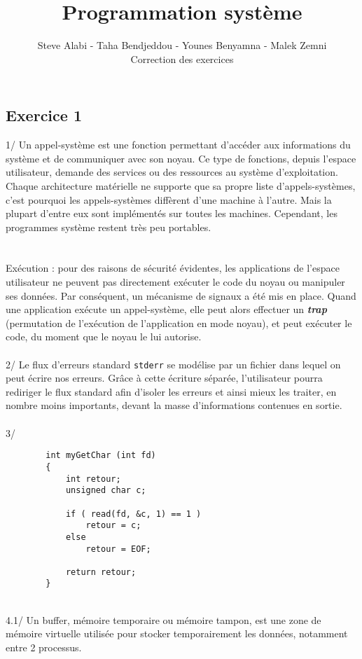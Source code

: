 \documentclass[a4paper,11pt]{article}
\title{\textbf{Programmation système}}
\author{
	Steve Alabi - Taha Bendjeddou - Younes Benyamna - Malek Zemni
	\vspace{1em}\\
	Correction des exercices
	\vspace{0.5em}
}
\begin{document}
\maketitle

	\subsection*{Exercice 1} 
	1/ Un appel-système est une fonction permettant d'accéder aux informations du système et de communiquer avec son noyau. Ce type de fonctions, depuis l’espace utilisateur, demande des services ou des ressources au système d’exploitation. Chaque architecture matérielle ne supporte que sa propre liste d’appels-systèmes, c’est pourquoi les appels-systèmes diffèrent d’une machine à l’autre. Mais la plupart d’entre eux sont implémentés sur toutes les machines. Cependant, les programmes système restent très peu portables.\\
	\\~\\
	Exécution : pour des raisons de sécurité évidentes, les applications de l’espace utilisateur ne peuvent pas directement exécuter le code du noyau ou manipuler ses données. Par conséquent, un mécanisme de signaux a été mis en place. Quand une application exécute un appel-système, elle peut alors effectuer un \textit{\textbf{trap}} (permutation de l’exécution de l’application en mode noyau), et peut exécuter le code, du moment que le noyau le lui autorise.
	\\~\\
	2/ Le flux d'erreurs standard \lstinline!stderr! se modélise par un fichier dans lequel on peut écrire nos erreurs. Grâce à cette écriture séparée, l'utilisateur pourra rediriger le flux standard afin d'isoler les erreurs et ainsi mieux les traiter, en nombre moins importants, devant la masse d'informations contenues en sortie. 
	\\~\\
	3/ 
	\begin{lstlisting}
		int myGetChar (int fd) 
		{
			int retour;
			unsigned char c;
			
			if ( read(fd, &c, 1) == 1 )
				retour = c;
			else
				retour = EOF;
				
			return retour;
		}
	\end{lstlisting}
	~\\
	4.1/ Un buffer, mémoire temporaire ou mémoire tampon, est une zone de mémoire virtuelle utilisée pour stocker temporairement les données, notamment entre 2 processus.
\end{document}

